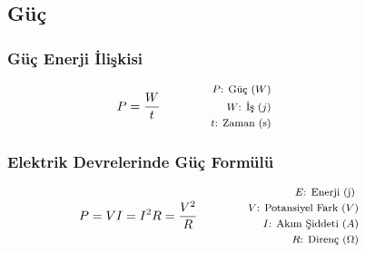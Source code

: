\subsection{Güç}

\subsubsection*{Güç Enerji İlişkisi}
\begin{equation}
    P = \frac{W}{t} \qquad \qquad \parbox{4cm}{\footnotesize$\begin{aligned}
        P\text{: Güç } (W) \\
        W\text{: İş } (j) \\
        t\text{: Zaman (s)}
\end{aligned}$}
\end{equation}

\subsubsection*{Elektrik Devrelerinde Güç Formülü}
\begin{equation}
    P = VI = I^2 R = \frac{V^2}{R} \qquad \qquad \parbox{4cm}{\footnotesize$\begin{aligned}
        E\text{: Enerji (j) } \\
        V\text{: Potansiyel Fark } (V) \\
        I\text{: Akım Şiddeti } (A) \\
        R\text{: Direnç } (\Omega)
\end{aligned}$}
\end{equation}